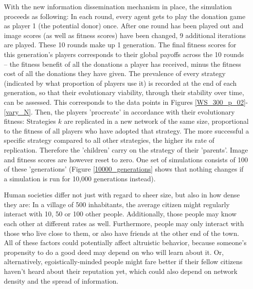 \documentclass{JASSS}
\begin{document}
With the new information dissemination mechanism in place, the simulation proceeds as following: In each round, every agent gets to play the donation game as player 1 (the potential donor) once. After one round has been played out and image scores (as well as fitness scores) have been changed, 9 additional iterations are played. These 10 rounds make up 1 generation. The final fitness scores for this generation's players corresponds to their global payoffs across the 10 rounds -- the fitness benefit of all the donations a player has received, minus the fitness cost of all the donations they have given. The prevalence of every strategy (indicated by what proportion of players use it) is recorded at the end of each generation, so that their evolutionary viability, through their stability over time, can be assessed. This corresponds to the data points in Figures \ref{WS_300_p_02}-\ref{vary_N}. Then, the players 'procreate' in accordance with their evolutionary fitness: Strategies $k$ are replicated in a new network of the same size, proportional to the fitness of all players who have adopted that strategy. The more successful a specific strategy compared to all other strategies, the higher its rate of replication. Therefore the 'children' carry on the strategy of their 'parents'. Image and fitness scores are however reset to zero. One set of simulations consists of 100 of these 'generations' (Figure \ref{10000_generations} shows that nothing changes if a simulation is run for 10,000 generations instead).

Human societies differ not just with regard to sheer size, but also in how dense they are: In a village of 500 inhabitants, the average citizen might regularly interact with 10, 50 or 100 other people. Additionally, those people may know each other at different rates as well. Furthermore, people may only interact with those who live close to them, or also have friends at the other end of the town. All of these factors could potentially affect altruistic behavior, because someone's propensity to do a good deed may depend on who will learn about it. Or, alternatively, egoistically-minded people might fare better if their fellow citizens haven't heard about their reputation yet, which could also depend on network density and the spread of information.
\end{document}
